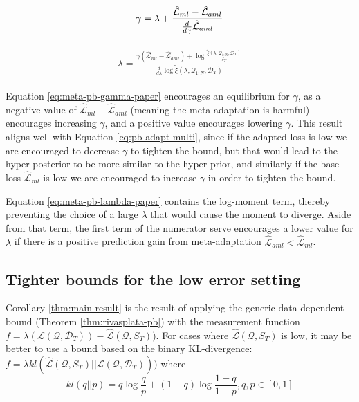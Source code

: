 \documentclass{article}
\theoremstyle{definition}
\begin{document}
\begin{align} \label{eq:meta-pb-gamma-paper}
\begin{split}
\gamma = \lambda+\frac{\hat{\mathcal{L}}_{ml}-\hat{\mathcal{L}}_{aml}}{\frac{d}{d\gamma}\hat{\mathcal{L}}_{aml}}
\end{split}\hfill
\end{align}

\begin{align} \label{eq:meta-pb-lambda-paper}
\begin{split}
\lambda = \frac{\gamma(\hat{\mathcal{L}}_{ml}-\hat{\mathcal{L}}_{aml})+\log\frac{\tilde{\xi}(\lambda,\mathcal{Q}_{1:N},\mathcal{D}_T)}{\delta_T}}{\frac{d}{d\lambda}\log\tilde{\xi}(\lambda,\mathcal{Q}_{1:N},\mathcal{D}_T)}
\end{split}
\end{align}

Equation \ref{eq:meta-pb-gamma-paper} encourages an equilibrium for $\gamma$, as a negative value of $\hat{\mathcal{L}}_{ml}-\hat{\mathcal{L}}_{aml}$ (meaning the meta-adaptation is harmful) encourages increasing $\gamma$, and a positive value encourages lowering $\gamma$.
This result aligns well with Equation \ref{eq:pb-adapt-multi}, since if the adapted loss is low we are encouraged to decrease $\gamma$ to tighten the bound, but that would lead to the hyper-posterior to be more similar to the hyper-prior, and similarly if the base loss $\hat{\mathcal{L}}_{ml}$ is low we are encouraged to increase $\gamma$ in order to tighten the bound.

Equation \ref{eq:meta-pb-lambda-paper} contains the log-moment term, thereby preventing the choice of a large $\lambda$ that would cause the moment to diverge. Aside from that term, 
the first term of the numerator serve encourages a lower value for $\lambda$ if there is a positive prediction gain from meta-adaptation $\hat{\mathcal{L}}_{aml}<\hat{\mathcal{L}}_{ml}$.

\subsection{Tighter bounds for the low error setting}

Corollary \ref{thm:main-result} is the result of applying the generic data-dependent bound (Theorem \ref{thm:rivasplata-pb}) with the measurement function $f=\lambda(\mathcal{L}(\mathcal{Q},\mathcal{D}_T))-\hat{\mathcal{L}}(\mathcal{Q}, S_T))$. For cases where $\hat{\mathcal{L}}(\mathcal{Q}, S_T)$ is low, it may be better to use a bound based on the binary KL-divergence: $f=\lambda kl(\hat{\mathcal{L}}(\mathcal{Q}, S_T)||\mathcal{L}(\mathcal{Q},\mathcal{D}_T)))$
where $$kl(q||p)=q \log\frac{q}{p}+(1-q)\log\frac{1-q}{1-p}, q,p\in[0, 1]$$
\end{document}
